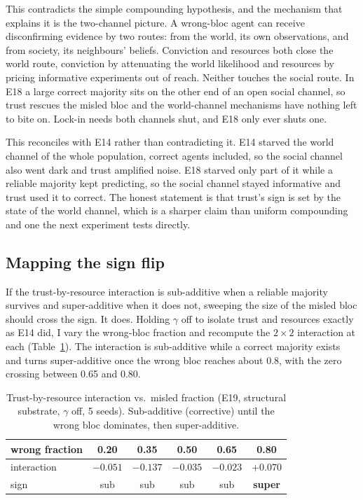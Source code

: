 \documentclass[11pt]{article}
\begin{document}
This contradicts the simple compounding hypothesis, and the mechanism that
explains it is the two-channel picture. A wrong-bloc agent can receive
disconfirming evidence by two routes: from the world, its own observations, and
from society, its neighbours' beliefs. Conviction and resources both close the
world route, conviction by attenuating the world likelihood and resources by
pricing informative experiments out of reach. Neither touches the social route.
In E18 a large correct majority sits on the other end of an open social channel,
so trust rescues the misled bloc and the world-channel mechanisms have nothing
left to bite on. Lock-in needs both channels shut, and E18 only ever shuts one.

This reconciles with E14 rather than contradicting it. E14 starved the world
channel of the whole population, correct agents included, so the social channel
also went dark and trust amplified noise. E18 starved only part of it while a
reliable majority kept predicting, so the social channel stayed informative and
trust used it to correct. The honest statement is that trust's sign is set by
the state of the world channel, which is a sharper claim than uniform
compounding and one the next experiment tests directly.

\subsection{Mapping the sign flip}
\label{sec:signflip}

If the trust-by-resource interaction is sub-additive when a reliable majority
survives and super-additive when it does not, sweeping the size of the misled
bloc should cross the sign. It does. Holding $\gamma$ off to isolate trust and
resources exactly as E14 did, I vary the wrong-bloc fraction and recompute the
$2\times2$ interaction at each (Table~\ref{tab:e19}). The interaction is
sub-additive while a correct majority exists and turns super-additive once the
wrong bloc reaches about 0.8, with the zero crossing between 0.65 and 0.80.

\begin{table}[t]
\centering
\caption{Trust-by-resource interaction vs.\ misled fraction (E19, structural
substrate, $\gamma$ off, 5 seeds). Sub-additive (corrective) until the wrong
bloc dominates, then super-additive.}
\label{tab:e19}
\begin{tabular}{lccccc}
\toprule
wrong fraction & 0.20 & 0.35 & 0.50 & 0.65 & 0.80 \\
\midrule
interaction & $-0.051$ & $-0.137$ & $-0.035$ & $-0.023$ & $+0.070$ \\
sign & sub & sub & sub & sub & \textbf{super} \\
\bottomrule
\end{tabular}
\end{table}
\end{document}
